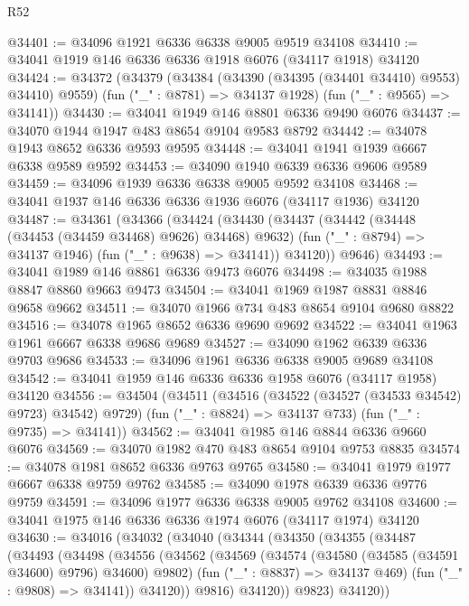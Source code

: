 \begin{lexlean}{R52}
\begin{coremodule}
@34401 := @34096 @1921 @6336 @6338 @9005 @9519 @34108
@34410 := @34041 @1919 @146 @6336 @6336 @1918 @6076 (@34117 @1918) @34120
@34424 := @34372
    (@34379
      (@34384 (@34390 (@34395 (@34401 @34410) @9553) @34410) @9559)
      (fun ("_" : @8781) => @34137 @1928)
      (fun ("_" : @9565) => @34141))
@34430 := @34041 @1949 @146 @8801 @6336 @9490 @6076
@34437 := @34070 @1944 @1947 @483 @8654 @9104 @9583 @8792
@34442 := @34078 @1943 @8652 @6336 @9593 @9595
@34448 := @34041 @1941 @1939 @6667 @6338 @9589 @9592
@34453 := @34090 @1940 @6339 @6336 @9606 @9589
@34459 := @34096 @1939 @6336 @6338 @9005 @9592 @34108
@34468 := @34041 @1937 @146 @6336 @6336 @1936 @6076 (@34117 @1936) @34120
@34487 := @34361
    (@34366
      (@34424
        (@34430
          (@34437
            (@34442 (@34448 (@34453 (@34459 @34468) @9626) @34468) @9632)
            (fun ("_" : @8794) => @34137 @1946)
            (fun ("_" : @9638) => @34141))
          @34120))
      @9646)
@34493 := @34041 @1989 @146 @8861 @6336 @9473 @6076
@34498 := @34035 @1988 @8847 @8860 @9663 @9473
@34504 := @34041 @1969 @1987 @8831 @8846 @9658 @9662
@34511 := @34070 @1966 @734 @483 @8654 @9104 @9680 @8822
@34516 := @34078 @1965 @8652 @6336 @9690 @9692
@34522 := @34041 @1963 @1961 @6667 @6338 @9686 @9689
@34527 := @34090 @1962 @6339 @6336 @9703 @9686
@34533 := @34096 @1961 @6336 @6338 @9005 @9689 @34108
@34542 := @34041 @1959 @146 @6336 @6336 @1958 @6076 (@34117 @1958) @34120
@34556 := @34504
    (@34511
      (@34516 (@34522 (@34527 (@34533 @34542) @9723) @34542) @9729)
      (fun ("_" : @8824) => @34137 @733)
      (fun ("_" : @9735) => @34141))
@34562 := @34041 @1985 @146 @8844 @6336 @9660 @6076
@34569 := @34070 @1982 @470 @483 @8654 @9104 @9753 @8835
@34574 := @34078 @1981 @8652 @6336 @9763 @9765
@34580 := @34041 @1979 @1977 @6667 @6338 @9759 @9762
@34585 := @34090 @1978 @6339 @6336 @9776 @9759
@34591 := @34096 @1977 @6336 @6338 @9005 @9762 @34108
@34600 := @34041 @1975 @146 @6336 @6336 @1974 @6076 (@34117 @1974) @34120
@34630 := @34016
    (@34032
      (@34040
        (@34344
          (@34350
            (@34355
              (@34487
                (@34493
                  (@34498
                    (@34556
                      (@34562
                        (@34569
                          (@34574 (@34580 (@34585 (@34591 @34600) @9796) @34600) @9802)
                          (fun ("_" : @8837) => @34137 @469)
                          (fun ("_" : @9808) => @34141))
                        @34120))
                    @9816)
                  @34120))
              @9823)
            @34120))

\end{coremodule}
\end{lexlean}
